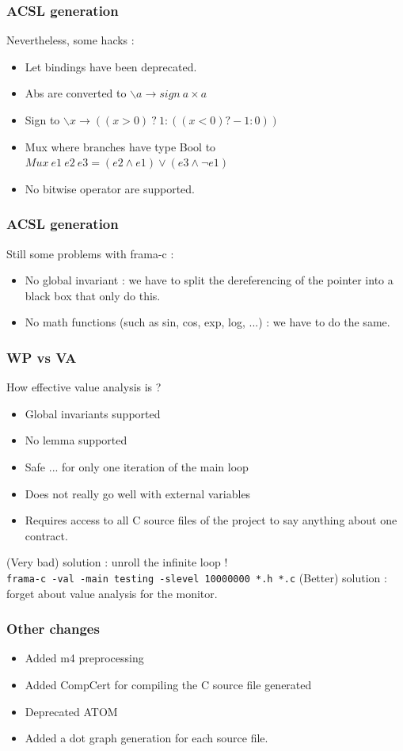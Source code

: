 \documentclass{beamer}
\begin{document}
\begin{frame}[fragile]
\frametitle{ACSL generation}
Nevertheless, some hacks :

\begin{itemize}
	\item Let bindings have been deprecated.
	\item Abs are converted to $\backslash a \rightarrow sign~a \times a$
	\item Sign to $\backslash x \rightarrow ((x > 0)~?~1 : ((x < 0) ? -1 : 0))$
	\item Mux where branches have type Bool to $Mux~e1~e2~e3 = ( e2 \wedge e1) \vee (e3 \wedge \neg e1)$
	\item No bitwise operator are supported.
\end{itemize}
\end{frame}

\begin{frame}[fragile]
	\frametitle{ACSL generation}
	Still some problems with frama-c :
	
	\begin{itemize}
		\item No global invariant : we have to split the dereferencing of the pointer into a black box that only do this.
		\item No math functions (such as sin, cos, exp, log, ...) : we have to do the same.
	\end{itemize}
\end{frame}

\begin{frame}[fragile]
	\frametitle{WP vs VA}
	How effective value analysis is ?
	\begin{itemize}
		\item Global invariants supported
		\item No lemma supported
		\item Safe ... for only one iteration of the main loop
		\item Does not really go well with external variables
		\item Requires access to all C source files of the project to say anything about one contract.
	\end{itemize}
	(Very bad) solution : unroll the infinite loop ! \\
	\texttt{frama-c -val -main testing -slevel 10000000 *.h *.c}
	(Better) solution : forget about value analysis for the monitor.
\end{frame}

\begin{frame}[fragile]
	\frametitle{Other changes}
	\begin{itemize}
		\item Added m4 preprocessing
		\item Added CompCert for compiling the C source file generated
		\item Deprecated ATOM
		\item Added a dot graph generation for each source file.
	\end{itemize}
\end{frame}
\end{document}
